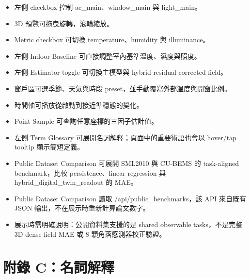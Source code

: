 \documentclass[12pt,a4paper]{article}
\begin{document}
\begin{itemize}
\item 左側 checkbox 控制 ac\_\allowbreak{}main、window\_\allowbreak{}main 與 light\_\allowbreak{}main。
\item 3D 預覽可拖曳旋轉，滾輪縮放。
\item Metric checkbox 可切換 temperature、humidity 與 illuminance。
\item 左側 Indoor Baseline 可直接調整室內基準溫度、濕度與照度。
\item 左側 Estimator toggle 可切換主模型與 hybrid residual corrected field。
\item 窗戶區可選季節、天氣與時段 preset，並手動覆寫外部溫度與開窗比例。
\item 時間軸可播放從啟動到接近準穩態的變化。
\item Point Sample 可查詢任意座標的三因子估計值。
\item 左側 Term Glossary 可展開名詞解釋；頁面中的重要術語也會以 hover/tap tooltip 顯示簡短定義。
\item Public Dataset Comparison 可展開 SML2010 與 CU-BEMS 的 task-aligned benchmark，比較 persistence、linear regression 與 hybrid\_\allowbreak{}digital\_\allowbreak{}twin\_\allowbreak{}readout 的 MAE。
\item Public Dataset Comparison 讀取 /api/public\_\allowbreak{}benchmarks，該 API 來自既有 JSON 輸出，不在展示時重新計算論文數字。
\item 展示時需明確說明：公開資料集支援的是 shared observable tasks，不是完整 3D dense field MAE 或 8 顆角落感測器校正驗證。
\end{itemize}

\section*{附錄 C：名詞解釋}
\end{document}

